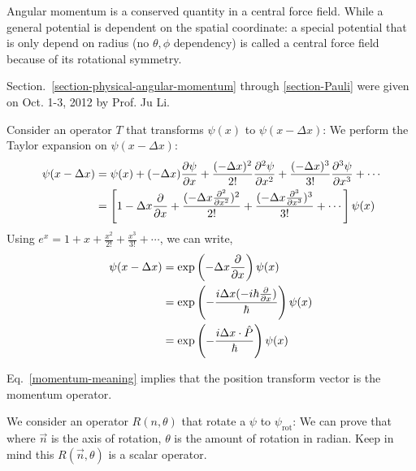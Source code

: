 \documentclass{school-22.101-notes}
\date{October 12, 2011}
\begin{document}
\maketitle

Angular momentum is a conserved quantity in a central force field. While a general potential is dependent on the spatial coordinate:
a special potential that is only depend on radius (no $\theta, \phi$ dependency) is called a central force field because of its rotational symmetry. 

Section.~\ref{section-physical-angular-momentum} through \ref{section-Pauli} were given on Oct. 1-3, 2012 by Prof. Ju Li. 

\clearpage
 Consider an operator $T$ that transforms $\psi(x)$ to $\psi(x-\Delta x)$: 
We perform the Taylor expansion on $\psi(x - \Delta x)$: 
\begin{align}
  \psi(x - \Delta x) &= \psi(x) + (-\Delta x) \frac{\partial \psi}{\partial x} + \frac{(-\Delta x)^2}{2!} \frac{\partial^{2} \psi}{\partial x ^{2}} + \frac{(-\Delta x)^3}{3!} \frac{\partial^{3} \psi}{\partial x ^{3}} + \cdots \\
  &= \left[ 1 - \Delta x \frac{\partial}{\partial x} + \frac{(-\Delta x \frac{\partial^{2} }{\partial x ^{2}})^2}{2!} + \frac{(-\Delta x \frac{\partial^{3} }{\partial x ^{3}})^3}{3!} + \cdots \right] \psi(x) 
\end{align}
Using $e^x = 1 + x + \frac{x^2}{2!} + \frac{x^3}{3!} + \cdots$, we can write, 
\begin{align}
  \psi(x - \Delta x) &= \exp \left( -\Delta x \frac{\partial}{\partial x} \right) \psi(x) \\
  &= \exp \left(- \frac{i \Delta x (-i \hbar \frac{\partial}{\partial x})}{\hbar} \right) \psi(x) \\
  &= \exp \left(-\frac{i \Delta x \cdot \hat{P} }{\hbar} \right) \psi(x) \label{momentum-meaning}
\end{align}

Eq.~\ref{momentum-meaning} implies that the position transform vector is the momentum operator. 


 We consider an operator $R(n, \theta)$ that rotate a $\psi$ to $\psi_{\mathrm{rot}}$: 
We can prove that 
where $\vec{n}$ is the axis of rotation, $\theta$ is the amount of rotation in radian.  Keep in mind this $R(\vec{n}, \theta)$ is a scalar operator. 
\end{document}

